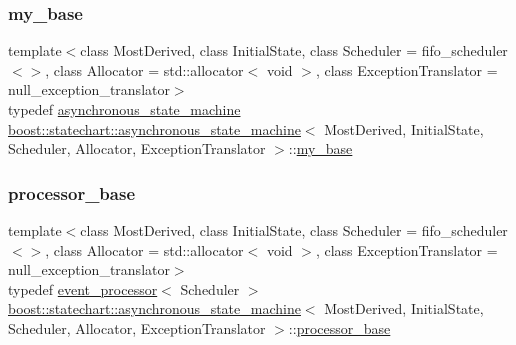 \mbox{\label{classboost_1_1statechart_1_1asynchronous__state__machine_ad2d3eb216740758af0982c1b04e7331d}} 
\subsubsection{\texorpdfstring{my\+\_\+base}{my\_base}}
{\footnotesize\ttfamily template$<$class Most\+Derived, class Initial\+State, class Scheduler = fifo\+\_\+scheduler$<$$>$, class Allocator = std\+::allocator$<$ void $>$, class Exception\+Translator = null\+\_\+exception\+\_\+translator$>$ \\
typedef \mbox{\hyperlink{classboost_1_1statechart_1_1asynchronous__state__machine}{asynchronous\+\_\+state\+\_\+machine}} \mbox{\hyperlink{classboost_1_1statechart_1_1asynchronous__state__machine}{boost\+::statechart\+::asynchronous\+\_\+state\+\_\+machine}}$<$ Most\+Derived, Initial\+State, Scheduler, Allocator, Exception\+Translator $>$\+::\mbox{\hyperlink{classboost_1_1statechart_1_1asynchronous__state__machine_ad2d3eb216740758af0982c1b04e7331d}{my\+\_\+base}}\hspace{0.3cm}{\ttfamily [protected]}}

\mbox{\label{classboost_1_1statechart_1_1asynchronous__state__machine_a59f192af18b9070396e42994a8dbeb35}} 
\subsubsection{\texorpdfstring{processor\+\_\+base}{processor\_base}}
{\footnotesize\ttfamily template$<$class Most\+Derived, class Initial\+State, class Scheduler = fifo\+\_\+scheduler$<$$>$, class Allocator = std\+::allocator$<$ void $>$, class Exception\+Translator = null\+\_\+exception\+\_\+translator$>$ \\
typedef \mbox{\hyperlink{classboost_1_1statechart_1_1event__processor}{event\+\_\+processor}}$<$ Scheduler $>$ \mbox{\hyperlink{classboost_1_1statechart_1_1asynchronous__state__machine}{boost\+::statechart\+::asynchronous\+\_\+state\+\_\+machine}}$<$ Most\+Derived, Initial\+State, Scheduler, Allocator, Exception\+Translator $>$\+::\mbox{\hyperlink{classboost_1_1statechart_1_1asynchronous__state__machine_a59f192af18b9070396e42994a8dbeb35}{processor\+\_\+base}}\hspace{0.3cm}{\ttfamily [private]}}



